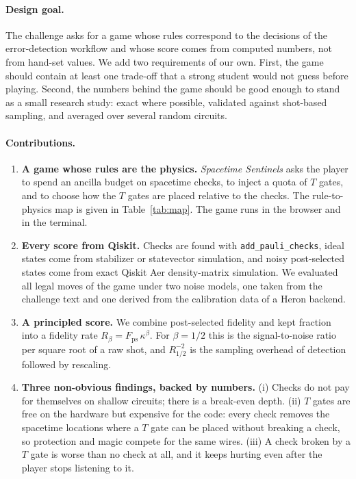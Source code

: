 \paragraph*{Design goal.} The challenge asks for a game whose rules correspond to the decisions of the error-detection workflow and whose score comes from computed numbers, not from hand-set values. We add two requirements of our own. First, the game should contain at least one trade-off that a strong student would not guess before playing. Second, the numbers behind the game should be good enough to stand as a small research study: exact where possible, validated against shot-based sampling, and averaged over several random circuits.

\paragraph*{Contributions.}
\begin{enumerate}[leftmargin=*,itemsep=2pt]
  \item \textbf{A game whose rules are the physics.} \emph{Spacetime Sentinels} asks the player to spend an ancilla budget on spacetime checks, to inject a quota of $T$ gates, and to choose how the $T$ gates are placed relative to the checks. The rule-to-physics map is given in Table~\ref{tab:map}. The game runs in the browser and in the terminal.
  \item \textbf{Every score from Qiskit.} Checks are found with \texttt{add\_pauli\_checks}, ideal states come from stabilizer or statevector simulation, and noisy post-selected states come from exact Qiskit Aer density-matrix simulation. We evaluated all \NumMoves{} legal moves of the game under two noise models, one taken from the challenge text and one derived from the calibration data of a Heron backend.
  \item \textbf{A principled score.} We combine post-selected fidelity and kept fraction into a fidelity rate $R_\beta=F_{\mathrm{ps}}\,\kappa^{\beta}$. For $\beta=1/2$ this is the signal-to-noise ratio per square root of a raw shot, and $R_{1/2}^{-2}$ is the sampling overhead of detection followed by rescaling.
  \item \textbf{Three non-obvious findings, backed by numbers.} (i) Checks do not pay for themselves on shallow circuits; there is a break-even depth. (ii) $T$ gates are free on the hardware but expensive for the code: every check removes the spacetime locations where a $T$ gate can be placed without breaking a check, so protection and magic compete for the same wires. (iii) A check broken by a $T$ gate is worse than no check at all, and it keeps hurting even after the player stops listening to it.
\end{enumerate}

